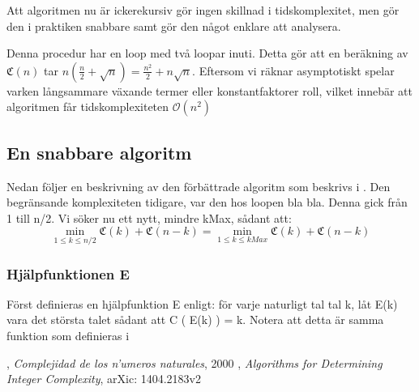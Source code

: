 \documentclass[a4paper,titlepage]{article}
\newcommand{\C}[1]{\mathfrak C \left( #1 \right)}
\renewcommand{\O}{\mathcal {O}}
\theoremstyle{definition}
\begin{document}
    Att algoritmen nu är ickerekursiv gör ingen skillnad i tidskomplexitet, men gör
    den i praktiken snabbare samt gör den något enklare att analysera.

    Denna procedur har en loop med två loopar inuti. Detta gör att en beräkning av
    $\C{n}$ tar $n\left(\frac{n}{2}+\sqrt n\right) = \frac{n^2}{2} + n\sqrt n$.
    Eftersom vi räknar asymptotiskt spelar varken långsammare växande termer eller
    konstantfaktorer roll,  vilket innebär att algoritmen får tidskomplexiteten
    $\O(n^2)$

    \subsection{En snabbare algoritm}
    Nedan följer en beskrivning av den förbättrade algoritm som beskrivs i \cite{algorithm_lune}.
    Den begränsande komplexiteten tidigare, var den hos loopen bla bla. Denna gick från 1 till n/2. Vi söker nu ett nytt, mindre kMax, sådant att:
    $$\min\limits_{1 \leq k \leq n/2} \C{k} + \C{n-k} = \min\limits_{1 \leq k \leq kMax} \C{k} + \C{n-k}$$
    \subsubsection{Hjälpfunktionen E}
    Först definieras en hjälpfunktion E enligt: för varje naturligt tal tal k, låt E(k) vara det största talet sådant att \C{E(k)} = k.
    Notera att detta är samma funktion som definieras i
\newpage
\begin{thebibliography}{9}

        , \emph{Complejidad de los n'umeros naturales}, 2000
     	, \emph{Algorithms for Determining Integer Complexity}, arXic: 1404.2183v2

\end{thebibliography}
%
\end{document}
